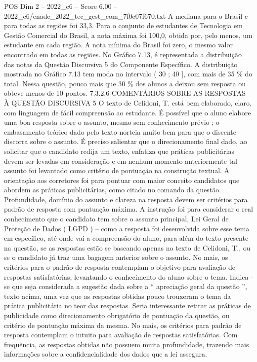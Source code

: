 \begin{textsample}{POS Dim 2 – 2022\_c6 – Score 6.00 – 2022\_c6/enade\_2022\_tec\_gest\_com\_7f0e07f670.txt}
A mediana para o Brasil e para todas as regiões foi 33,3.
Para o conjunto de estudantes de Tecnologia em Gestão Comercial do Brasil, a nota máxima foi 100,0, obtida por, pelo menos, um estudante em cada região.
A nota mínima do Brasil foi zero, o mesmo valor encontrado em todas as regiões.
No Gráfico 7.13, é representada a distribuição das notas da Questão Discursiva 5 do Componente Específico.
A distribuição mostrada no Gráfico 7.13 tem moda no intervalo ( 30 ; 40 ], com mais de 35 \% do total.
Nessa questão, pouco mais que 30 \% dos alunos a deixou sem resposta ou obteve menos de 10 pontos. 7.3.2.6 COMENTÁRIOS SOBRE AS RESPOSTAS À QUESTÃO DISCURSIVA 5 O texto de Celidoni, T. está bem elaborado, claro, com linguagem de fácil compreensão ao estudante.
É possível que o aluno elabore uma boa resposta sobre o assunto, mesmo sem conhecimento prévio ; o embasamento teórico dado pelo texto norteia muito bem para que o discente discorra sobre o assunto.
É preciso salientar que o direcionamento final dado, ao solicitar que o candidato redija um texto, enfatiza que práticas publicitárias devem ser levadas em consideração e em nenhum momento anteriormente tal assunto foi levantado como critério de pontuação na construção textual.
A orientação aos corretores foi para pontuar com maior conceito candidatos que abordem as práticas publicitárias, como citado no comando da questão.
Profundidade, domínio do assunto e clareza na resposta devem ser critérios para padrão de resposta com pontuação máxima.
A instrução foi para considerar o real conhecimento que o candidato tem sobre o assunto principal, Lei Geral de Proteção de Dados ( LGPD ) – como a resposta foi desenvolvida sobre esse tema em específico, até onde vai a compreensão do aluno, para além do texto presente na questão, se as respostas estão se baseando apenas no texto de Celidoni, T., ou se o candidato já traz uma bagagem anterior sobre o assunto.
No mais, os critérios para o padrão de resposta contemplam o objetivo para avaliação de respostas satisfatórias, levantando o conhecimento do aluno sobre o tema.
Indica -se que seja considerada a sugestão dada sobre a “ apreciação geral da questão ”, texto acima, uma vez que as respostas obtidas pouco trouxeram o tema da prática publicitária no teor das respostas.
Seria interessante retirar as práticas de publicidade como direcionamento obrigatório de pontuação da questão, ou critério de pontuação máxima da mesma.
No mais, os critérios para padrão de resposta contemplam o intuito para avaliação de respostas satisfatórias.
Com frequência, as respostas obtidas não possuem muita profundidade, trazendo mais informações sobre a confidencialidade dos dados que a lei assegura.

\end{textsample}
